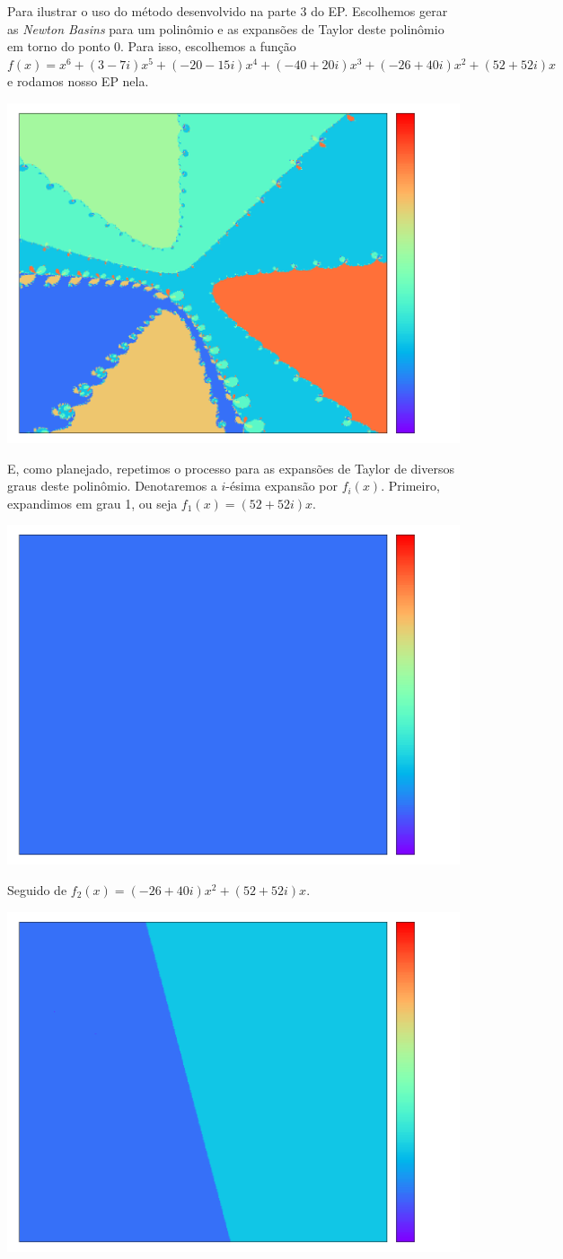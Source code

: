 \documentclass{article}
\begin{document}
Para ilustrar o uso do método desenvolvido na parte 3 do EP. Escolhemos gerar as \textit{Newton Basins} para um polinômio e as expansões de Taylor deste polinômio em torno do ponto 0. Para isso, escolhemos a função $f(x) = x^6 + (3-7i)x^5 + (-20-15i)x^4 + (-40+20i)x^3 + (-26+40i)x^2 + (52+52i)x$ e rodamos nosso EP nela.  
\begin{center}\includegraphics[width=0.75\columnwidth]{original} \end{center}
E, como planejado, repetimos o processo para as expansões de Taylor de diversos graus deste polinômio. Denotaremos a $i$-ésima expansão por $f_i(x)$. Primeiro, expandimos em grau 1, ou seja $f_1(x) = (52+52i)x$.  
\begin{center}\includegraphics[width=0.75\columnwidth]{expand_1} \end{center}
Seguido de $f_2(x) = (-26+40i)x^2 + (52+52i)x$.  
\begin{center}\includegraphics[width=0.75\columnwidth]{expand_2} \end{center}
\end{document}
